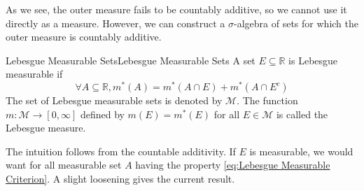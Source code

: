 \documentclass[../main.tex]{subfiles}
\begin{document}
As we see, the outer measure fails to be countably additive, so we cannot use it directly as a measure. However, we can construct a $\sigma$-algebra of sets for which the outer measure is countably additive.

\begin{definition}{Lebesgue Measurable Sets}{Lebesgue Measurable Sets}
	A set $E \subseteq \mathbb{R}$ is Lebesgue measurable if
	\begin{equation}\label{eq:Lebesgue Measurable Criterion}
	\forall A \subseteq \mathbb{R}, m^*(A) = m^*(A \cap E) + m^*(A \cap E^c)
	\end{equation}
	The set of Lebesgue measurable sets is denoted by $\mathcal{M}$. The function $m: \mathcal{M} \rightarrow [0,\infty ]$ defined by $m(E) = m^*(E)$ for all $E\in \mathcal{M}$ is called the Lebesgue measure.
\end{definition}

\begin{remark}
	The intuition follows from the countable additivity. If $E$ is measurable, we would want for all measurable set $A$ having the property \ref{eq:Lebesgue Measurable Criterion}. A slight loosening gives the current result.
\end{remark}
\end{document}
